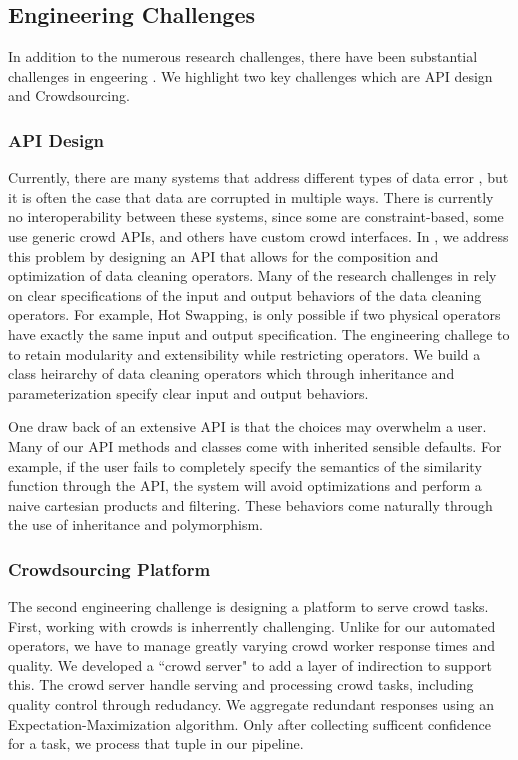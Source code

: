 \subsection{Engineering Challenges}
In addition to the numerous research challenges, there have been substantial challenges in engeering \sys.
We highlight two key challenges which are API design and Crowdsourcing.

\subsubsection{API Design}
Currently, there are many systems that address different types of data error \cite{gokhale2014corleone,park2014crowdfill,eracer,chen2014integrating}, but it is often 
the case that data are corrupted in multiple ways.
There is currently no interoperability between these systems, since some are constraint-based, some use generic crowd APIs, and others have custom crowd interfaces.
In \sys, we address this problem by designing an API that allows for the composition and optimization of data cleaning operators.
Many of the research challenges in \sys rely on clear specifications of the input and output behaviors of
the data cleaning operators.
For example, Hot Swapping, is only possible if two physical operators have exactly the same input and output specification.
The engineering challege to to retain modularity and extensibility while restricting operators.
We build a class heirarchy of data cleaning operators which through inheritance and parameterization specify clear input and output behaviors.

One draw back of an extensive API is that the choices may overwhelm a user.
Many of our API methods and classes come with inherited sensible defaults.
For example, if the user fails to completely specify the semantics of the similarity function through the API, 
the system will avoid optimizations and perform a naive cartesian products and filtering.
These behaviors come naturally through the use of inheritance and polymorphism.

\subsubsection{Crowdsourcing Platform}
The second engineering challenge is designing a platform to serve crowd tasks.
First, working with crowds is inherrently challenging.
Unlike for our automated operators, we have to manage greatly varying crowd worker
response times and quality.
We developed a ``crowd server" to add a layer of indirection to support this.
The crowd server handle serving and processing crowd tasks, including quality control through redudancy.
We aggregate redundant responses using an Expectation-Maximization algorithm.
Only after collecting sufficent confidence for a task, we process that tuple in our pipeline.

